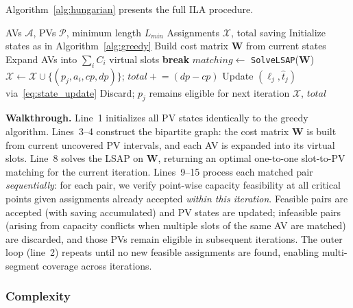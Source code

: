 \documentclass[conference]{IEEEtran}
\begin{document}
Algorithm~\ref{alg:hungarian} presents the full ILA procedure.

\begin{algorithm}[htbp]
\caption{Iterative Linear Assignment (ILA) for Multi-AV Matching}
\label{alg:hungarian}
\begin{algorithmic}[1]
\REQUIRE AVs $\mathcal{A}$, PVs $\mathcal{P}$, minimum length $L_{min}$
\ENSURE Assignments $\mathcal{X}$, total saving
\STATE Initialize states as in Algorithm~\ref{alg:greedy}
\REPEAT
    \STATE Build cost matrix $\mathbf{W}$ from current states
    \STATE Expand AVs into $\sum_i C_i$ virtual slots
        \STATE \textbf{break}
    \ENDIF
    \STATE $matching \leftarrow$ \texttt{SolveLSAP}($\mathbf{W}$)
            \STATE $\mathcal{X} \leftarrow \mathcal{X} \cup \{(p_j, a_i, cp, dp)\}$;\; $total \mathrel{+}= (dp - cp)$
            \STATE Update $(\ell_j, \hat{t}_j)$ via~\eqref{eq:state_update}
        \ELSE
            \STATE Discard; $p_j$ remains eligible for next iteration
        \ENDIF
    \ENDFOR
{}
\RETURN $\mathcal{X}$, $total$
\end{algorithmic}
\end{algorithm}

\textbf{Walkthrough.} Line~1 initializes all PV states identically to the greedy algorithm. Lines~3--4 construct the bipartite graph: the cost matrix $\mathbf{W}$ is built from current uncovered PV intervals, and each AV is expanded into its virtual slots. Line~8 solves the LSAP on $\mathbf{W}$, returning an optimal one-to-one slot-to-PV matching for the current iteration. Lines~9--15 process each matched pair \textit{sequentially}: for each pair, we verify point-wise capacity feasibility at all critical points given assignments already accepted \textit{within this iteration}. Feasible pairs are accepted (with saving accumulated) and PV states are updated; infeasible pairs (arising from capacity conflicts when multiple slots of the same AV are matched) are discarded, and those PVs remain eligible in subsequent iterations. The outer loop (line~2) repeats until no new feasible assignments are found, enabling multi-segment coverage across iterations.

\subsubsection{Complexity}
\end{document}
